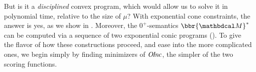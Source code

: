 \documentclass{article}
\newcommand\obslimit{observational facet} %
\begin{document}
But is it a \emph{disciplined} convex program, which would allow us to solve it in polynomial time, relative to the size of $\mu$?
% 
With exponential cone constraints,
the answer is yes, as we show in .
Moreover,
the $0^+$-semantics
$\bbr{\dg M}^*$ can be computed via a sequence of two exponential conic programs ().
To give the flavor of how these constructions proceed, and ease into the more complicated ones, we begin simply by finding minimizers of $\mathit{O\mskip-2.5muI\mskip-3.5mun\mskip-1.7muc}$, the simpler of the two scoring functions.

%
\end{document}
